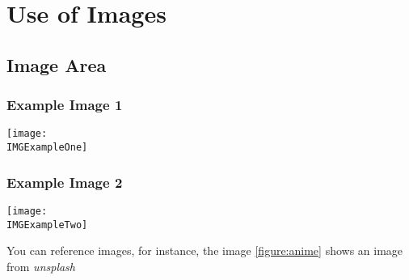 \chapter{Use of Images}

\section{Image Area}
\subsection{Example Image 1}

\texttt{[image: \\IMGExampleOne]}

\subsection{Example Image 2}
  
\texttt{[image: \\IMGExampleTwo]}
\label{figure:anime}

You can reference images, for instance, the image \ref{figure:anime} shows 
an image from \textit{unsplash}